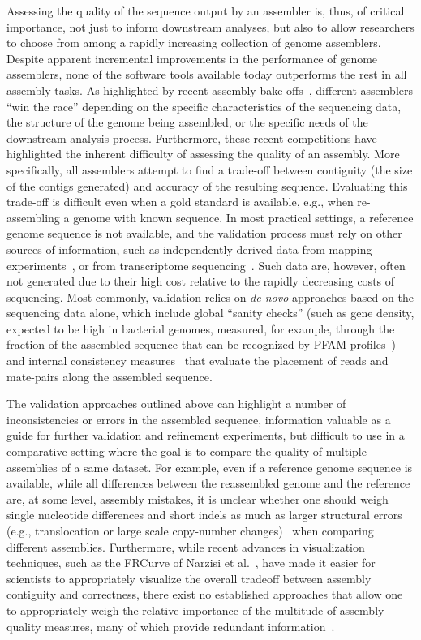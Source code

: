 Assessing the quality of the sequence output by an assembler is, thus,
of critical importance, not just to inform downstream analyses, but
also to allow researchers to choose from among a rapidly increasing
collection of genome assemblers. Despite apparent incremental
improvements in the performance of genome assemblers, none of the
software tools available today outperforms the rest in all assembly
tasks.  As highlighted by recent assembly
bake-offs~\cite{earl2011assemblathon,salzberg2011gage}, different
assemblers ``win the race'' depending on the specific characteristics
of the sequencing data, the structure of the genome being assembled,
or the specific needs of the downstream analysis process.
Furthermore, these recent competitions have highlighted the inherent
difficulty of assessing the quality of an assembly.  More
specifically, all assemblers attempt to find a trade-off between
contiguity (the size of the contigs generated) and accuracy of the
resulting sequence.  Evaluating this trade-off is difficult even when
a gold standard is available, e.g., when re-assembling a genome with
known sequence.  In most practical settings, a reference genome
sequence is not available, and the validation process must rely on
other sources of information, such as independently derived data from
mapping experiments~\cite{zhou2007validation}, or from transcriptome
sequencing~\cite{adamidi2011novo}. Such data are, however, often not
generated due to their high cost relative to the rapidly decreasing
costs of sequencing. Most commonly, validation relies on \emph{de
  novo} approaches based on the sequencing data alone, which include
global ``sanity checks'' (such as gene density, expected to be high in
bacterial genomes, measured, for example, through the fraction of the
assembled sequence that can be recognized by PFAM
profiles~\cite{genovo2011}) and internal consistency
measures~\cite{amosvalidate2008} that evaluate the placement of reads
and mate-pairs along the assembled sequence.

The validation approaches outlined above can highlight a number of
inconsistencies or errors in the assembled sequence, information
valuable as a guide for further validation and refinement experiments,
but difficult to use in a comparative setting where the goal is to
compare the quality of multiple assemblies of a same dataset.  For
example, even if a reference genome sequence is available, while all
differences between the reassembled genome and the reference are, at
some level, assembly mistakes, it is unclear whether one should weigh
single nucleotide differences and short indels as much as larger
structural errors (e.g., translocation or large scale copy-number
changes)~\cite{earl2011assemblathon} when comparing different
assemblies.  Furthermore, while recent advances in visualization
techniques, such as the FRCurve of Narzisi et
al.~\cite{FRC2011,vezzi2012feature}, have made it easier for
scientists to appropriately visualize the overall tradeoff between
assembly contiguity and correctness, there exist no established
approaches that allow one to appropriately weigh
the relative importance of the multitude of assembly quality measures,
many of which provide redundant information~\cite{vezzi2012feature}.

